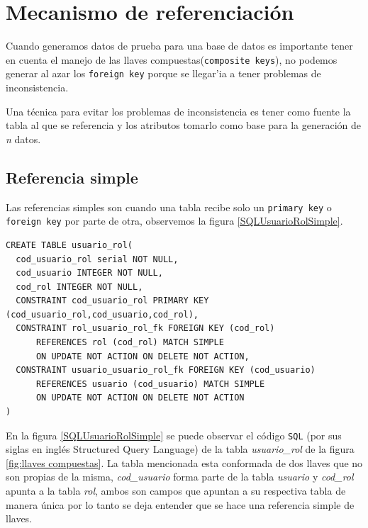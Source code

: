 \section{Mecanismo de referenciaci\'on}
Cuando generamos datos de prueba para una base de datos es importante tener en cuenta el manejo de las llaves compuestas(\texttt{composite keys}), no podemos generar al azar los \texttt{foreign key} porque se llegar'ia a tener problemas de inconsistencia.

Una t\'ecnica para evitar los problemas de inconsistencia es tener como fuente la tabla al que se referencia y los atributos  tomarlo como base para la generaci\'on de \emph{n} datos.
\subsection{Referencia simple}
Las referencias simples son cuando una tabla recibe solo un \texttt{primary key} o \texttt{foreign key} por parte de otra, observemos la figura \ref{SQLUsuarioRolSimple}.
\lstset{language=sql,breaklines=true}
\label{SQLUsuarioRolSimple}
\begin{lstlisting}
CREATE TABLE usuario_rol(
  cod_usuario_rol serial NOT NULL,
  cod_usuario INTEGER NOT NULL,
  cod_rol INTEGER NOT NULL,
  CONSTRAINT cod_usuario_rol PRIMARY KEY (cod_usuario_rol,cod_usuario,cod_rol),
  CONSTRAINT rol_usuario_rol_fk FOREIGN KEY (cod_rol)
      REFERENCES rol (cod_rol) MATCH SIMPLE
      ON UPDATE NOT ACTION ON DELETE NOT ACTION,
  CONSTRAINT usuario_usuario_rol_fk FOREIGN KEY (cod_usuario)
      REFERENCES usuario (cod_usuario) MATCH SIMPLE
      ON UPDATE NOT ACTION ON DELETE NOT ACTION
)
\end{lstlisting}
En la figura \ref{SQLUsuarioRolSimple} se puede observar el c\'odigo  \texttt{SQL} (por sus siglas en ingl\'es Structured Query Language) de la tabla \textit{usuario\_rol} de la figura \ref{fig:llaves compuestas}.  La tabla mencionada esta conformada de dos llaves que no son propias de la misma, \textit{cod\_usuario} forma parte de la tabla \textit{usuario} y \textit{cod\_rol} apunta a la tabla \textit{rol}, ambos son campos que apuntan a su respectiva tabla de manera \'unica por lo tanto se deja entender que se hace una referencia simple de llaves.
